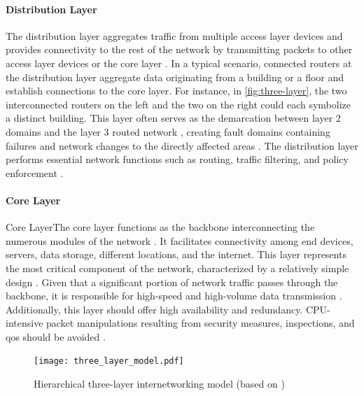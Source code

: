 \paragraph{Distribution Layer} %
\label{par:Distribution Layer}
The distribution layer aggregates traffic from multiple access layer devices
    and provides connectivity to the rest of the network by transmitting
    packets to other access layer devices or the core layer
    \cite{cisco_campus_net}.
In a typical scenario, connected routers at the distribution layer aggregate
    data originating from a building or a floor and establish connections to
    the core layer.
For instance, in \autoref{fig:three-layer}, the two interconnected routers on
    the left and the two on the right could each symbolize a distinct building.
This layer often serves as the demarcation between layer 2 domains and the
    layer 3 routed network \cite{cisco_net_size}, creating fault domains
    containing failures and network changes to the directly affected areas
    \cite{cisco_design_guide}.
The distribution layer performs essential network functions such as routing,
    traffic filtering, and policy enforcement \cite{cisco_campus_net}.


\paragraph{Core Layer} %
\label{par:Core Layer}
Core LayerThe core layer functions as the backbone interconnecting the numerous modules
    of the network \cite{cisco_campus_net}.
It facilitates connectivity among end devices, servers, data storage, different
    locations, and the internet.
This layer represents the most critical component of the network, characterized
    by a relatively simple design \cite{cisco_design_guide}.
Given that a significant portion of network traffic passes through the
    backbone, it is responsible for high-speed and high-volume data
    transmission \cite{cisco_campus_net}.
Additionally, this layer should offer high availability and redundancy.
CPU-intensive packet manipulations resulting from security measures,
    inspections, and \gls{qos} should be avoided \cite{cisco_campus_net}.


\begin{figure}
    \begin{center}
        \texttt{[image: three\_layer\_model.pdf]}
    \end{center}
    \caption[Hierarchical three-layer internetworking model]{
        Hierarchical three-layer internetworking model (based on
        \cite{cisco_3_tier})}
    \label{fig:three-layer}
\end{figure}


